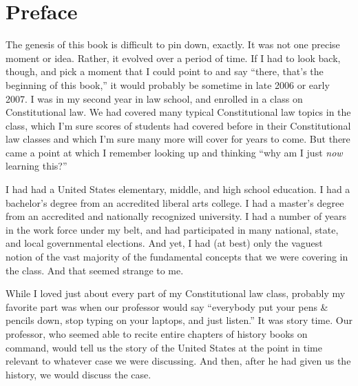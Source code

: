 %
%
%
%
%
%

\chapter{Preface}

The genesis of this book is difficult to pin down, exactly.  It was not one precise moment or idea.  Rather, it evolved over a period of time.  If I had to look back, though, and pick a moment that I could point to and say ``there, that's the beginning of this book,'' it would probably be sometime in late 2006 or early 2007.  I was in my second year in law school, and enrolled in a class on Constitutional law.  We had covered many typical Constitutional law topics in the class, which I'm sure scores of students had covered before in their Constitutional law classes and which I'm sure many more will cover for years to come.  But there came a point at which I remember looking up and thinking ``why am I just \textit{now} learning this?''  

I had had a United States elementary, middle, and high school education.  I had a bachelor's degree from an accredited liberal arts college.  I had a master's degree from an accredited and nationally recognized university.  I had a number of years in the work force under my belt, and had participated in many national, state, and local governmental elections.  And yet, I had (at best) only the vaguest notion of the vast majority of the fundamental concepts that we were covering in the class.  And that seemed strange to me.

While I loved just about every part of my Constitutional law class, probably my favorite part was when our professor would say ``everybody put your pens \& pencils down, stop typing on your laptops, and just listen.''  It was story time.  Our professor, who seemed able to recite entire chapters of history books on command, would tell us the story of the United States at the point in time relevant to whatever case we were discussing.  And then, after he had given us the history, we would discuss the case.  


